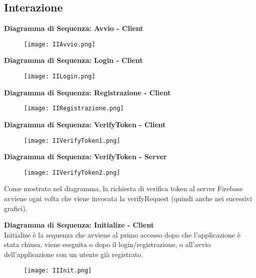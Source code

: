 \clearpage
\subsection{Interazione}

\textbf{Diagramma di Sequenza: Avvio - Client}\\
\begin{figure}[h!]
    \begin{center}
        \texttt{[image: IIAvvio.png]}
    \end{center}
\end{figure}

\textbf{Diagramma di Sequenza: Login - Client}\\
\begin{figure}[h!]
    \begin{center}
        \texttt{[image: IILogin.png]}
    \end{center}
\end{figure}
\clearpage

\textbf{Diagramma di Sequenza: Registrazione - Client}\\
\begin{figure}[h!]
    \begin{center}
        \texttt{[image: IIRegistrazione.png]}
    \end{center}
\end{figure}


\textbf{Diagramma di Sequenza: VerifyToken - Client}\\
\begin{figure}[h!]
    \begin{center}
        \texttt{[image: IIVerifyToken1.png]}
    \end{center}
\end{figure}
\clearpage
\textbf{Diagramma di Sequenza: VerifyToken - Server}\\
\begin{figure}[h!]
    \begin{center}
        \texttt{[image: IIVerifyToken2.png]}
    \end{center}
\end{figure}

Come mostrato nel diagramma, la richiesta di verifica token al server Firebase avviene ogni volta che viene invocata la verifyRequest (quindi anche nei sucessivi grafici).
\clearpage

\textbf{Diagramma di Sequenza: Initialize - Client}\\
Initialize è la sequenza che avviene al primo accesso dopo che l'applicazione è stata chiusa. viene eseguita o dopo il login/registrazione, o all'avvio dell'applicazione con un utente già registrato.
\begin{figure}[h!]
    \begin{center}
        \texttt{[image: IIInit.png]}
    \end{center}
\end{figure}

